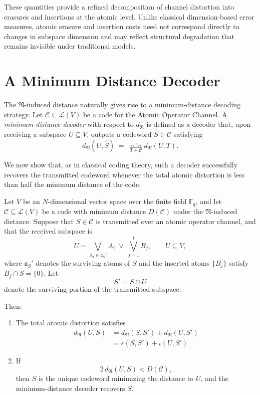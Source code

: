 \documentclass{svproc}
\begin{document}
These quantities provide a refined decomposition of channel distortion into
erasures and insertions at the atomic level.
Unlike classical dimension-based error measures, atomic erasure and insertion
costs need not correspond directly to changes in subspace dimension and may
reflect structural degradation that remains invisible under traditional models.


\section{A Minimum Distance Decoder}\label{sec:minimum-distance-decoder}

The $\mathfrak N$-induced distance naturally gives rise to a minimum-distance
decoding strategy.
Let $\mathcal C \subseteq \mathcal L(V)$ be a code for the Atomic Operator Channel.
A \emph{minimum-distance decoder} with respect to $d_{\mathfrak N}$ is defined as
a decoder that, upon receiving a subspace $U \subseteq V$, outputs a codeword
$\widehat S \in \mathcal C$ satisfying
\[
d_{\mathfrak N}(U,\widehat S)
\;=\;
\min_{T\in\mathcal C} d_{\mathfrak N}(U,T).
\]

We now show that, as in classical coding theory, such a decoder successfully
recovers the transmitted codeword whenever the total atomic distortion is less
than half the minimum distance of the code.

\begin{theorem}\label{thm:error-erasure-correction}
Let $V$ be an $N$-dimensional vector space over the finite field $\mathbb F_q$, and
let $\mathcal C \subseteq \mathcal L(V)$ be a code with minimum distance
$D(\mathcal C)$ under the $\mathfrak N$-induced distance.
Suppose that $S\in\mathcal C$ is transmitted over an atomic operator channel, and
that the received subspace is
\[
U
=
\bigvee_{A_i \in \mathfrak a_S'} A_i
\;\vee\;
\bigvee_{j=1}^{t} B_j,
\qquad U \subseteq V,
\]
where $\mathfrak a_S'$ denotes the surviving atoms of $S$ and the inserted atoms
$\{B_j\}$ satisfy $B_j \cap S = \{0\}$.
Let
\[
S' = S \cap U
\]
denote the surviving portion of the transmitted subspace.

Then:
\begin{enumerate}
\item The total atomic distortion satisfies
\begin{align*}
d_{\mathfrak N}(U,S)
&=
d_{\mathfrak N}(S,S') + d_{\mathfrak N}(U,S')\\
&=\epsilon(S,S') +  \iota(U,S')
\end{align*}

\item If
\[
2\,d_{\mathfrak N}(U,S) < D(\mathcal C),
\]
then $S$ is the unique codeword minimizing the distance to $U$, and the
minimum-distance decoder recovers $S$.
\end{enumerate}
\end{theorem}
\end{document}
